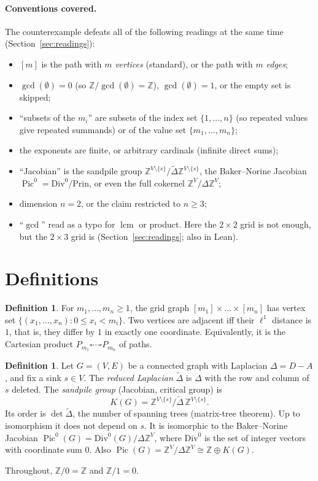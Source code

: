 \documentclass[11pt]{article}
\theoremstyle{definition}
\newtheorem{definition}[theorem]{Definition}
\theoremstyle{remark}
\newcommand{\Z}{\mathbb{Z}}
\newcommand{\Pic}{\operatorname{Pic}}
\begin{document}
\paragraph{Conventions covered.} The counterexample defeats all of the
following readings at the same time (Section~\ref{sec:readings}):
\begin{itemize}
\item $[m]$ is the path with $m$ \emph{vertices} (standard), or the path with
$m$ \emph{edges};
\item $\gcd(\emptyset)=0$ (so $\Z/\gcd(\emptyset)=\Z$), $\gcd(\emptyset)=1$, or
the empty set is skipped;
\item ``subsets of the $m_i$'' are subsets of the index set $\{1,\dots,n\}$
(so repeated values give repeated summands) or of the value set
$\{m_1,\dots,m_n\}$;
\item the exponents are finite, or arbitrary cardinals (infinite direct sums);
\item ``Jacobian'' is the sandpile group $\Z^{V\setminus\{s\}}/\tilde\Delta\Z^{V\setminus\{s\}}$,
the Baker--Norine Jacobian $\Pic^0=\mathrm{Div}^0/\mathrm{Prin}$, or even the
full cokernel $\Z^V/\Delta\Z^V$;
\item dimension $n=2$, or the claim restricted to $n\ge3$;
\item ``$\gcd$'' read as a typo for $\operatorname{lcm}$ or product. Here the
$2\times2$ grid is not enough, but the $2\times3$ grid is
(Section~\ref{sec:readings}; also in Lean).
\end{itemize}

\section{Definitions}
\begin{definition}
For $m_1,\dots,m_n\ge1$, the grid graph $[m_1]\times\dots\times[m_n]$ has
vertex set $\{(x_1,\dots,x_n):0\le x_i<m_i\}$. Two vertices are adjacent iff
their $\ell^1$ distance is $1$, that is, they differ by $1$ in exactly one
coordinate. Equivalently, it is the Cartesian product $P_{m_1}\square\cdots\square P_{m_n}$
of paths.
\end{definition}

\begin{definition}
Let $G=(V,E)$ be a connected graph with Laplacian $\Delta=D-A$, and fix a sink
$s\in V$. The \emph{reduced Laplacian} $\tilde\Delta$ is $\Delta$ with the row
and column of $s$ deleted. The \emph{sandpile group} (Jacobian, critical group)
is
\[
K(G)=\Z^{V\setminus\{s\}}/\tilde\Delta\,\Z^{V\setminus\{s\}} .
\]
Its order is $\det\tilde\Delta$, the number of spanning trees
(matrix-tree theorem). Up to isomorphism it does not depend on $s$. It is
isomorphic to the Baker--Norine Jacobian
$\Pic^0(G)=\mathrm{Div}^0(G)/\Delta\Z^V$, where $\mathrm{Div}^0$ is the set of
integer vectors with coordinate sum $0$. Also $\Pic(G)=\Z^V/\Delta\Z^V\cong\Z\oplus K(G)$.
\end{definition}
Throughout, $\Z/0=\Z$ and $\Z/1=0$.
\end{document}
